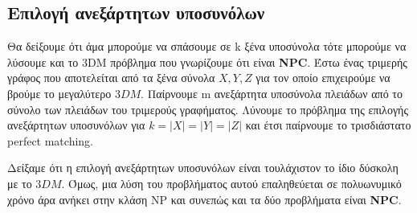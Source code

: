 \documentclass[a4paper,oneside, 11pt]{article}
\begin{document}
\subsection{Επιλογή ανεξάρτητων υποσυνόλων}
Θα δείξουμε ότι άμα μπορούμε να σπάσουμε σε k ξένα υποσύνολα τότε μπορούμε να λύσουμε και το 3DM πρόβλημα που γνωρίζουμε ότι είναι \textbf{NPC}. \bigbreak 
Έστω ένας τριμερής γράφος που αποτελείται από τα ξένα σύνολα $X, Y, Z$ για τον οποίο επιχειρούμε να βρούμε το μεγαλύτερο $3DM$. Παίρνουμε m ανεξάρτητα υποσύνολα πλειάδων από το σύνολο των πλειάδων του τριμερούς γραφήματος. Λύνουμε το πρόβλημα της επιλογής ανεξάρτητων υποσυνόλων για $k = |X| = |Y| = |Z|$ και έτσι παίρνουμε το τρισδιάστατο perfect matching. \bigbreak 

Δείξαμε ότι η επιλογή ανεξάρτητων υποσυνόλων είναι τουλάχιστον το ίδιο δύσκολη με το $3DM$. Όμως, μια λύση του προβλήματος αυτού επαληθεύεται σε πολυωνυμικό χρόνο άρα ανήκει στην κλάση NP και συνεπώς και τα δύο προβλήματα είναι \textbf{NPC}.

\nocite{*}


\end{document}
